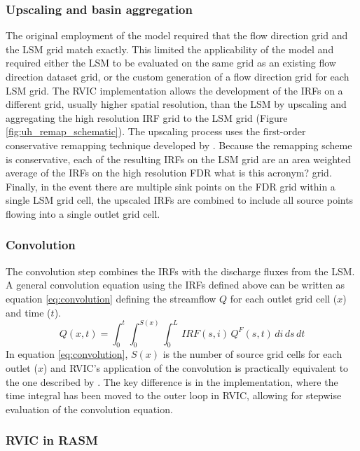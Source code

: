 \documentclass[jgrga, draft]{agutex}
\begin{document}
\begin{article}
\subsubsection{Upscaling and basin aggregation}
\label{sec:remap}

The original employment of the \citet{Lohmann_1996} model required that the flow direction grid and the LSM grid match exactly.
This limited the applicability of the model and required either the LSM to be evaluated on the same grid as an existing flow direction dataset grid, or the custom generation of a flow direction grid for each LSM grid.
The RVIC implementation allows the development of the IRFs on a different grid, usually higher spatial resolution, than the LSM by upscaling and aggregating the high resolution IRF grid to the LSM grid (Figure \ref{fig:uh_remap_schematic}).
The upscaling process uses the first-order conservative remapping technique developed by \citep{Jones_1999}.
Because the remapping scheme is conservative, each of the resulting IRFs on the LSM grid are an area weighted average of the IRFs on the high resolution FDR {what is this acronym?} grid.
Finally, in the event there are multiple sink points on the FDR grid within a single LSM grid cell, the upscaled IRFs are combined to include all source points flowing into a single outlet grid cell.

\subsubsection{Convolution}
\label{sec:convolution}

The convolution step combines the IRFs with the discharge fluxes from the LSM.
A general convolution equation using the IRFs defined above can be written as equation \ref{eq:convolution} defining the streamflow $Q$ for each outlet grid cell ($x$) and time ($t$).
\begin{equation}
  \label{eq:convolution}
   Q(x,t) = \int_0^{t} \int_0^{S(x)} \int_0^{L}\,IRF(s,i)\,Q^F(s, t)\,di\,ds\,dt
 \end{equation}
In equation \ref{eq:convolution}, $S(x)$ is the number of source grid cells for each outlet ($x$) and
RVIC's application of the convolution is practically equivalent to the one described by \citet{Lohmann_1996}.
The key difference is in the implementation, where the time integral has been moved to the outer loop in RVIC, allowing for stepwise evaluation of the convolution equation. 

\subsubsection{RVIC in RASM}


\end{article}
\end{document}
